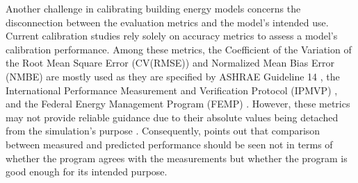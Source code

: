 \documentclass[3p,times,12pt]{elsarticle}
\begin{document}
\begin{sloppypar}
Another challenge in calibrating building energy models concerns the disconnection between the evaluation metrics and the model's intended use. Current calibration studies rely solely on accuracy metrics to assess a model's calibration performance. Among these metrics, the Coefficient of the Variation of the Root Mean Square Error (CV(RMSE)) and Normalized Mean Bias Error (NMBE) are mostly used as they are specified by ASHRAE Guideline 14 \cite{guideline200214}, the International Performance Measurement and Verification Protocol (IPMVP) \cite{united2001international}, and the Federal Energy Management Program (FEMP) \cite{femp2015m}. However, these metrics may not provide reliable guidance due to their absolute values being detached from the simulation's purpose \cite{chong2021calibrating}.
Consequently, \citet{reddy2007calibrating} points out that comparison between measured and predicted performance should be seen not in terms of whether the program agrees with the measurements but whether the program is good enough for its intended purpose. 


\end{sloppypar}
\end{document}
